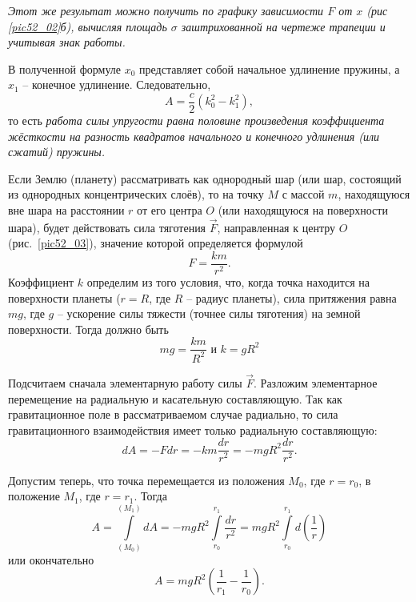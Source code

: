 \emph{Этот же результат можно получить по графику зависимости 
\( F \) от \( x \) (рис \ref{pic52_02}б), вычисляя площадь \( \sigma \) 
заштрихованной на чертеже трапеции и учитывая знак работы.}

В полученной формуле \( x_0 \) представляет собой начальное удлинение 
пружины, а \( x_1 \) -- конечное удлинение. 
Следовательно, 
\[
    A = \frac{c}{2} \left( k^{2}_0 - k^{2}_1 \right),
\]
то есть \emph{работа силы упругости равна половине произведения 
коэффициента жёсткости на разность квадратов начального и конечного 
удлинения (или сжатий) пружины.}

Если Землю (планету) рассматривать как однородный шар (или шар, 
состоящий из однородных концентрических слоёв), то на точку \( M \) с 
массой \( m \), находящуюся вне шара на расстоянии \( r \) от его 
центра \( O \) (или находящуюся на поверхности шара), будет действовать 
сила тяготения \( \vec{F} \), направленная к центру \( O \)
(рис.~\ref{pic52_03}), значение которой определяется формулой 
\[
    F = \frac{km}{r^2}.
\]
Коэффициент \( k \) определим из того условия, что, когда точка 
находится на поверхности планеты (\( r = R \), где \( R \) -- радиус планеты), 
сила притяжения равна \( mg \), где \( g \) -- ускорение силы тяжести 
(точнее силы тяготения) на земной поверхности. Тогда должно быть
\[ mg = \frac{km}{R^2} \text{ и } k = gR^2 \]

Подсчитаем сначала элементарную работу силы \( \vec{F} \). Разложим элементарное
перемещение на радиальную и касательную составляющую. Так как гравитационное
поле в рассматриваемом случае радиально, то сила гравитационного взаимодействия
имеет только радиальную составляющую:
\[
    dA = -Fdr = -km\frac{dr}{r^2} = -mgR^2 \frac{dr}{r^2}.
\]

Допустим теперь, что точка перемещается из положения \( M_0 \), где 
\( r = r_0 \), в положение \( M_1 \), где \( r = r_1 \). Тогда 
\[ 
    A = \int\limits_{(M_0)}^{(M_1)} dA = 
    -mgR^2 \int\limits_{r_0}^{r_1} \frac{dr}{r^2} =
    mgR^2 \int\limits_{r_0}^{r_1} d\left( \frac{1}{r} \right)
\]
или окончательно
\[
    A = mgR^2 \left( \frac{1}{r_1} - \frac{1}{r_0} \right).
\]

\newpage
